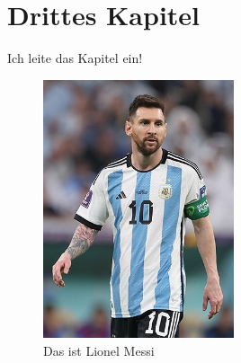 

\chapter{Drittes Kapitel}\label{ch:drittes_kapitel}

Ich leite das Kapitel ein!

\begin{figure}[H]
    \centering
    \includegraphics[width=0.5\textwidth]{contents/03_Drittes_Kapitel/Messi}
    \caption{Das ist Lionel Messi}
    \label{fig:messi_1}
\end{figure}

